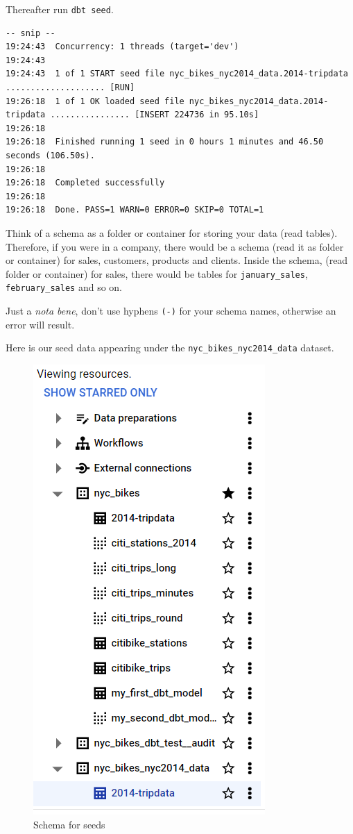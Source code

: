 \documentclass[
]{book}
\begin{document}
Thereafter run \texttt{dbt\ seed}.

\begin{verbatim}
-- snip --
19:24:43  Concurrency: 1 threads (target='dev')
19:24:43  
19:24:43  1 of 1 START seed file nyc_bikes_nyc2014_data.2014-tripdata .................... [RUN]
19:26:18  1 of 1 OK loaded seed file nyc_bikes_nyc2014_data.2014-tripdata ................ [INSERT 224736 in 95.10s]
19:26:18  
19:26:18  Finished running 1 seed in 0 hours 1 minutes and 46.50 seconds (106.50s).
19:26:18  
19:26:18  Completed successfully
19:26:18  
19:26:18  Done. PASS=1 WARN=0 ERROR=0 SKIP=0 TOTAL=1
\end{verbatim}

Think of a schema as a folder or container for storing your data (read tables). Therefore, if you were in a company, there would be a schema (read it as folder or container) for sales, customers, products and clients. Inside the schema, (read folder or container) for sales, there would be tables for \texttt{january\_sales}, \texttt{february\_sales} and so on.

Just a \emph{nota bene}, don't use hyphens \texttt{(-)} for your schema names, otherwise an error will result.

Here is our seed data appearing under the \texttt{nyc\_bikes\_nyc2014\_data} dataset.

\begin{figure}
\centering
\includegraphics{./images/seeds_schema.png}
\caption{Schema for seeds}
\end{figure}
\end{document}
